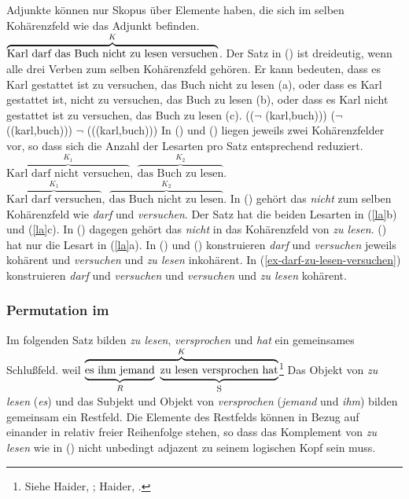 Adjunkte können nur Skopus über Elemente haben, die sich im selben Kohärenzfeld
wie das Adjunkt befinden.
\ea
\label{ex-darf-zu-lesen-versuchen}
$\overbrace{ \mbox{Karl darf\iw{dürfen} das Buch nicht zu lesen versuchen} }^{K}$.
\z
Der Satz in () ist dreideutig, wenn alle drei Verben zum selben Kohärenzfeld
gehören. Er kann bedeuten, dass es Karl gestattet ist zu versuchen,
das Buch nicht zu lesen (a), oder dass es Karl gestattet ist, nicht zu versuchen, das Buch zu lesen (b),
oder dass es Karl nicht gestattet ist zu versuchen, das Buch zu lesen (c).
\eal
\label{la}
\ex {}(($\neg$ (karl,buch)))
\ex {}($\neg$ ((karl,buch)))
\ex $\neg$ (((karl,buch)))
\zl
In () und () liegen jeweils zwei Kohärenzfelder vor, so dass
sich die Anzahl der Lesarten pro Satz entsprechend reduziert.
\ea
$\overbrace{ \mbox{Karl darf nicht versuchen}}^{K_1},~\overbrace{\mbox{das Buch zu lesen}}^{K_2}$.
\z
\ea
$\overbrace{ \mbox{Karl darf versuchen}}^{K_1},~\overbrace{\mbox{das Buch nicht zu lesen}}^{K_2}$.
\z
In () gehört das \emph{nicht} zum selben Kohärenzfeld wie \emph{darf}
und \emph{versuchen}. Der Satz hat die beiden Lesarten in (\ref{la}b) und (\ref{la}c).
In () dagegen gehört das \emph{nicht} in das Kohärenzfeld
von \emph{zu lesen}. () hat nur die Lesart in (\ref{la}a). In () und ()
konstruieren \emph{darf} und \emph{versuchen} jeweils kohärent und \emph{versuchen} und \emph{zu
lesen} inkohärent. In (\ref{ex-darf-zu-lesen-versuchen}) konstruieren \emph{darf} und
\emph{versuchen} und \emph{versuchen} und \emph{zu lesen} kohärent.

\subsubsection{Permutation im \mf}

Im folgenden Satz bilden \emph{zu lesen}, \emph{versprochen} und \emph{hat}
ein gemeinsames Schlußfeld.
\ea
\label{zu-lesen-versp}
weil $\overbrace{ \underbrace{\rule[-0.5ex]{0cm}{2.5ex}\mbox{es ihm jemand} }_{R}~
                    \underbrace{\rule[-0.5ex]{0cm}{2.5ex}\mbox{zu lesen versprochen\iw{versprechen} hat}}_{\mbox{\footnotesize S}}
                  }^{K}$\footnote{
        Siehe Haider, \citeyear[]{Haider86c}; Haider, \citeyear[]{Haider90b}.
}
\z
Das Objekt von \emph{zu lesen} (\emph{es})
und das Subjekt und Objekt von \emph{versprochen} (\emph{jemand} und \emph{ihm})
bilden gemeinsam ein Restfeld. Die Elemente des Restfelds können in Bezug
auf einander in relativ freier Reihenfolge stehen, so dass das Komplement von \emph{zu lesen}
wie in () nicht unbedingt adjazent zu seinem logischen Kopf sein muss.

